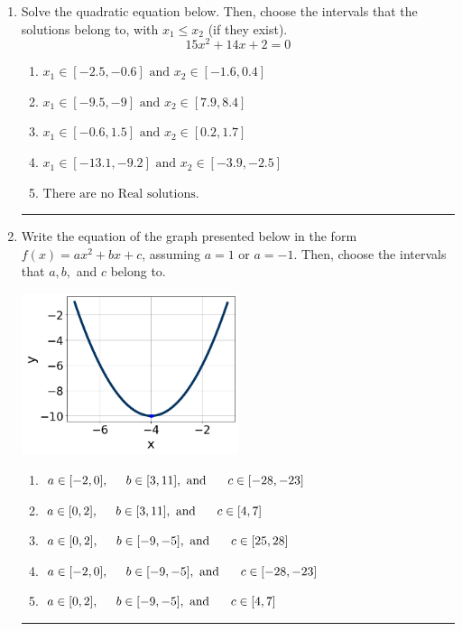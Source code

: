 \documentclass[14pt]{extbook}
\newcommand{\litem}[1]{\item#1\hspace*{-1cm}\rule{\textwidth}{0.4pt}}
\begin{document}
\begin{enumerate}
\litem{
Solve the quadratic equation below. Then, choose the intervals that the solutions belong to, with $x_1 \leq x_2$ (if they exist).\[ 15x^{2} +14 x + 2 = 0 \]\begin{enumerate}[label=\Alph*.]
\item \( x_1 \in [-2.5, -0.6] \text{ and } x_2 \in [-1.6, 0.4] \)
\item \( x_1 \in [-9.5, -9] \text{ and } x_2 \in [7.9, 8.4] \)
\item \( x_1 \in [-0.6, 1.5] \text{ and } x_2 \in [0.2, 1.7] \)
\item \( x_1 \in [-13.1, -9.2] \text{ and } x_2 \in [-3.9, -2.5] \)
\item \( \text{There are no Real solutions.} \)

\end{enumerate} }
\litem{
Write the equation of the graph presented below in the form $f(x)=ax^2+bx+c$, assuming  $a=1$ or $a=-1$. Then, choose the intervals that $a, b,$ and $c$ belong to.
\begin{center}
    \includegraphics[width=0.5\textwidth]{../Figures/quadraticGraphToEquationCopyA.png}
\end{center}
\begin{enumerate}[label=\Alph*.]
\item \( a \in [-2, 0], \hspace*{5mm} b \in [3, 11], \text{ and } \hspace*{5mm} c \in [-28, -23] \)
\item \( a \in [0, 2], \hspace*{5mm} b \in [3, 11], \text{ and } \hspace*{5mm} c \in [4, 7] \)
\item \( a \in [0, 2], \hspace*{5mm} b \in [-9, -5], \text{ and } \hspace*{5mm} c \in [25, 28] \)
\item \( a \in [-2, 0], \hspace*{5mm} b \in [-9, -5], \text{ and } \hspace*{5mm} c \in [-28, -23] \)
\item \( a \in [0, 2], \hspace*{5mm} b \in [-9, -5], \text{ and } \hspace*{5mm} c \in [4, 7] \)


\end{enumerate}}
\end{enumerate}
\end{document}
